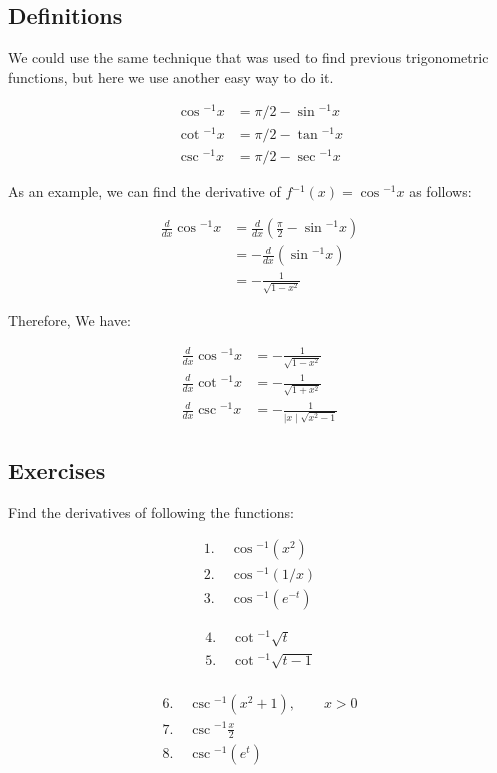 \documentclass[fleqn]{article}
\begin{document}
\subsection*{Definitions}

\noindent
We could use the same technique that was used to find previous trigonometric functions,
but here we use another easy way to do it.

\begin{align*}
    \cos{^{-1} x} &= \pi/2 - \sin{^{-1} x} \\
    \cot{^{-1} x} &= \pi/2 - \tan{^{-1} x} \\
    \csc{^{-1} x} &= \pi/2 - \sec{^{-1} x}
\end{align*}

\noindent
As an example, we can find the derivative of $f{^{-1} (x)} = \cos{^{-1} x}$ as follows:
\newline

\begin{align*}
    \frac{d}{dx}\cos{^{-1} x} &= \frac{d}{dx}\left(\frac{\pi}{2} - \sin{^{-1} x}\right) \\
    &= -\frac{d}{dx}\left(\sin{^{-1} x}\right) \\
    &= -\frac{1}{\sqrt{1 - x^2}}
\end{align*}

\noindent
Therefore, We have:
\newline

\begin{align*}
    \frac{d}{dx}\cos{^{-1} x} &= -\frac{1}{\sqrt{1 - x^2}} \\
    \frac{d}{dx}\cot{^{-1} x} &= -\frac{1}{\sqrt{1 + x^2}} \\
    \frac{d}{dx}\csc{^{-1} x} &= -\frac{1}{\mid{x}\mid\sqrt{x^2 - 1}}
\end{align*}

\subsection*{Exercises}

\noindent
Find the derivatives of following the functions:
\newline

\begin{align*}
1.\;&\cos{^{-1} (x^2)} \\
2.\;&\cos{^{-1} (1/x)} \\
3.\;&\cos{^{-1} (e^{-t})}
\end{align*}

\begin{align*}
4.\;&\cot{^{-1} \sqrt{t}} \\
5.\;&\cot{^{-1} \sqrt{t-1}} \\
\end{align*}

\begin{align*}
6.\;&\csc{^{-1} \left(x^2 + 1\right)},\qquad{x>0} \\
7.\;&\csc{^{-1} \frac{x}{2}} \\
8.\;&\csc{^{-1} \left(e^t\right)}
\end{align*}
\end{document}
